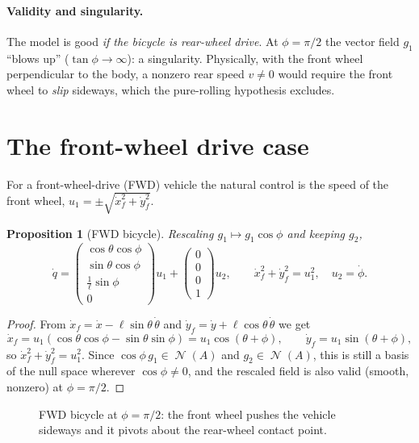 \documentclass[11pt,a4paper]{article}
\DeclareMathOperator{\Ker}{\mathcal{N}}
\theoremstyle{plain}
\newtheorem{proposition}[theorem]{Proposition}
\theoremstyle{definition}
\theoremstyle{remark}
\newcommand{\wheel}[3]{\begin{scope}[shift={#1},rotate=#2]
  \draw[fill=#3,rounded corners=1pt] (-0.4,-0.12) rectangle (0.4,0.12);\end{scope}}
\begin{document}
\paragraph{Validity and singularity.} The model is good \emph{if the bicycle is rear-wheel drive}. At $\phi=\pi/2$ the vector field $g_1$ ``blows up'' ($\tan\phi\to\infty$): a singularity. Physically, with the front wheel perpendicular to the body, a nonzero rear speed $v\neq0$ would require the front wheel to \emph{slip} sideways, which the pure-rolling hypothesis excludes.

\section{The front-wheel drive case}

For a front-wheel-drive (FWD) vehicle the natural control is the speed of the front wheel, $u_1=\pm\sqrt{\dot x_f^2+\dot y_f^2}$.

\begin{proposition}[FWD bicycle]
Rescaling $g_1\mapsto g_1\cos\phi$ and keeping $g_2$,
\[
\dot q=\begin{pmatrix}\cos\theta\cos\phi\\ \sin\theta\cos\phi\\ \frac1\ell\sin\phi\\ 0\end{pmatrix}u_1+\begin{pmatrix}0\\0\\0\\1\end{pmatrix}u_2,
\qquad \dot x_f^2+\dot y_f^2=u_1^2,\quad u_2=\dot\phi .
\]
\end{proposition}
\begin{proof}
From $\dot x_f=\dot x-\ell\sin\theta\,\dot\theta$ and $\dot y_f=\dot y+\ell\cos\theta\,\dot\theta$ we get
\[
\dot x_f=u_1(\cos\theta\cos\phi-\sin\theta\sin\phi)=u_1\cos(\theta+\phi),\qquad
\dot y_f=u_1\sin(\theta+\phi),
\]
so $\dot x_f^2+\dot y_f^2=u_1^2$. Since $\cos\phi\,g_1\in\Ker(A)$ and $g_2\in\Ker(A)$, this is still a basis of the null space wherever $\cos\phi\ne0$, and the rescaled field is also valid (smooth, nonzero) at $\phi=\pi/2$.
\end{proof}

\begin{figure}[H]
\centering
{}
\caption{FWD bicycle at $\phi=\pi/2$: the front wheel pushes the vehicle sideways and it pivots about the rear-wheel contact point.}
\label{fig:pivot}
\end{figure}
\end{document}
